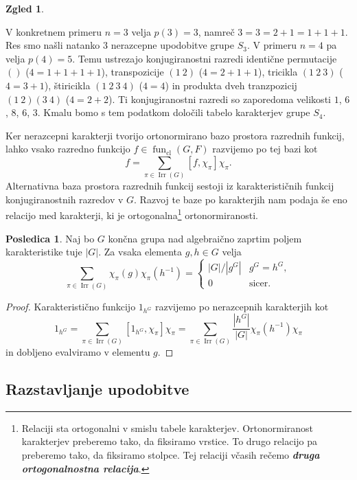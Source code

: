 \documentclass[11pt]{book}
\DeclareMathOperator\Irr{Irr}
\DeclareMathOperator\cl{cl}
\DeclareMathOperator\fun{fun}
\def\definicija{\color{rdeca}\bf\em}
\theoremstyle{definition}
\theoremstyle{zgled}
\newtheorem*{zgled}{Zgled}
\theoremstyle{odprtproblem}
\theoremstyle{domacanaloga}
\newenvironment{dokaz}
    {\color{siva}\begin{proof}}
    {\end{proof}}
\theoremstyle{izrek}
\newtheorem*{posledica}{Posledica}
\begin{document}
\begin{zgled}
\begin{itemize}
V konkretnem primeru $n = 3$ velja $p(3) = 3$, namreč $3 = 3 = 2 + 1 = 1 + 1 + 1$. Res smo našli natanko $3$ nerazcepne upodobitve grupe $S_3$. V primeru $n = 4$ pa velja $p(4) = 5$. Temu ustrezajo konjugiranostni razredi identične permutacije $()$ ($4 = 1 + 1 + 1 + 1$), transpozicije $(1 \ 2)$ ($4 = 2 + 1 + 1$), tricikla $(1 \ 2 \ 3)$ ($4 = 3 + 1$), štiricikla $(1 \ 2 \ 3 \ 4)$ ($4 = 4$) in produkta dveh tranzpozicij $(1 \ 2)(3 \ 4)$ ($4 = 2 + 2$). Ti konjugiranostni razredi so zaporedoma velikosti $1$, $6$, $8$, $6$, $3$. Kmalu bomo s tem podatkom določili tabelo karakterjev grupe $S_4$.
\end{itemize}
\end{zgled}

Ker nerazcepni karakterji tvorijo ortonormirano bazo prostora razrednih funkcij, lahko vsako razredno funkcijo $f \in \fun_{\cl}(G,F)$ razvijemo po tej bazi kot
\[
    f = \sum_{\pi \in \Irr(G)} [ f, \chi_{\pi} ] \chi_{\pi}.
\]
Alternativna baza prostora razrednih funkcij sestoji iz karakterističnih funkcij konjugiranostnih razredov v $G$. Razvoj te baze po karakterjih nam podaja še eno relacijo med karakterji, ki je ortogonalna\footnote{Relaciji sta ortogonalni v smislu tabele karakterjev. Ortonormiranost karakterjev preberemo tako, da fiksiramo vrstice. To drugo relacijo pa preberemo tako, da fiksiramo stolpce. Tej relaciji včasih rečemo {\definicija druga ortogonalnostna relacija}.} ortonormiranosti.

\begin{posledica}
Naj bo $G$ končna grupa nad algebraično zaprtim poljem karakteristike tuje $|G|$. Za vsaka elementa $g,h \in G$ velja
\[
    \sum_{\pi \in \Irr(G)} \chi_{\pi}(g) \chi_{\pi}(h^{-1}) = \begin{cases}
        |G|/|g^G| & g^G = h^G, \\
        0 & \text{sicer.}
    \end{cases}
\]
\end{posledica}
\begin{dokaz}
Karakteristično funkcijo $1_{h^G}$ razvijemo po nerazcepnih karakterjih kot
\[
    1_{h^G} = \sum_{\pi \in \Irr(G)} [ 1_{h^G}, \chi_{\pi} ] \chi_{\pi}
    = \sum_{\pi \in \Irr(G)} \frac{|h^G|}{|G|} \chi_{\pi}(h^{-1}) \chi_{\pi}
\]
in dobljeno evalviramo v elementu $g$.
\end{dokaz}

\subsection{Razstavljanje upodobitve}
\end{document}
